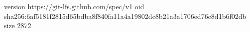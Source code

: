 version https://git-lfs.github.com/spec/v1
oid sha256:6af5181f2815d65bdba8f840fa11a4a19802dc8b21a3a1706ed76c8d1b6f02db
size 2872
